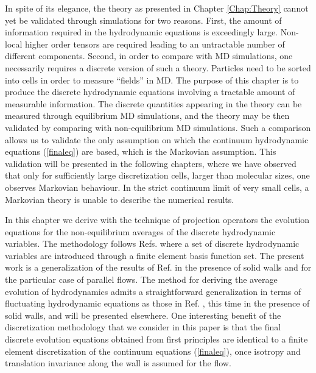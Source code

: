 \documentclass[b5paper,openright,11pt]{book}
\begin{document}
In   spite   of   its   elegance,   the   theory   as   presented   in
Chapter \ref{Chap:Theory}  cannot yet  be validated  through simulations
for two  reasons.  First,  the amount of  information required  in the
hydrodynamic equations  is exceedingly  large. Non-local  higher order
tensors are  required leading  to an  untractable number  of different
components.   Second, in  order to  compare with  MD simulations,  one
necessarily requires  a discrete version  of such a  theory. Particles
need to  be sorted into  cells in order  to measure ``fields''  in MD.
The  purpose  of  this chapter  is  to  produce  the  discrete
hydrodynamic  equations involving  a  tractable  amount of  measurable
information. The  discrete quantities appearing  in the theory  can be
measured through  equilibrium MD  simulations, and  the theory  may be
then validated by comparing with non-equilibrium MD simulations.  Such
a comparison  allows us to validate  the only assumption on  which the
continuum hydrodynamic equations (\ref{finaleq}) are
based, which  is the  Markovian assumption.   This validation  will be
presented in the following chapters, where  we have observed  that only
for  sufficiently large  discretization cells,  larger than  molecular
sizes,  one observes  Markovian  behaviour.  In  the strict  continuum
limit of  very small cells, a  Markovian theory is unable  to describe
the numerical  results.  

In  this chapter  we  derive  with  the technique  of  projection
operators the  evolution equations for the  non-equilibrium averages of
the discrete  hydrodynamic variables.   The methodology  follows Refs.
\cite{Espanol2009i,Espanol2009c,DelaTorre2015,EspanolDonev2015}  where
a  set of  discrete hydrodynamic  variables are  introduced through  a
finite  element   basis  function   set.   The   present  work   is  a
generalization of the results  of Ref.  \cite{EspanolDonev2015} in the
presence of solid walls and for the particular case of parallel flows.
The method for deriving the  average evolution of hydrodynamics admits
a straightforward generalization in  terms of fluctuating hydrodynamic
equations as those  in Ref. \cite{EspanolDonev2015}, this  time in the
presence  of  solid  walls,  and will  be  presented  elsewhere.   One
interesting benefit of the discretization methodology that we consider
in this paper is that  the final discrete evolution equations obtained
from first principles are identical to a finite element discretization
of the  continuum equations  (\ref{finaleq}),  once isotropy
and translation invariance along the wall is assumed for the flow.
\end{document}
